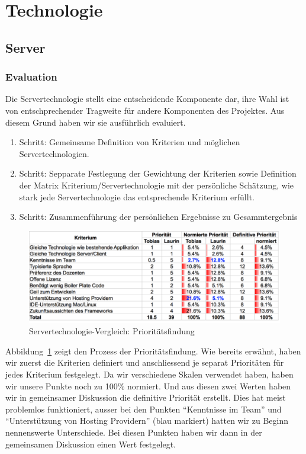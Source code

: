 \section{Technologie}
	\subsection{Server}

		\subsubsection{Evaluation}\label{serverEvaluation}
			Die Servertechnologie stellt eine entscheidende Komponente dar, 
			ihre Wahl ist von entschprechender Tragweite für andere Komponenten des Projektes.
			Aus diesem Grund haben wir sie ausführlich evaluiert.
			
			\begin{enumerate}
				\item Schritt: Gemeinsame Definition von Kriterien und möglichen Servertechnologien.
				\item Schritt: Sepparate Festlegung der Gewichtung der Kriterien sowie Definition der Matrix Kriterium/Servertechnologie mit der persönliche Schätzung, wie stark jede Servertechnologie das entsprechende Kriterium erfüllt.
				\item Schritt: Zusammenführung der persönlichen Ergebnisse zu Gesammtergebnis
			\end{enumerate}
		
			\begin{figure}[H]
				\begin{minipage}[b]{\linewidth}
					\includegraphics[width=\textwidth]{media/spreadsheets/ServertechnologieVergleichPrioritaetsfinding.pdf}
					\centering
					\caption{Servertechnologie-Vergleich: Prioritätsfindung}
					\label{fig:ServertechnologieVergleichPrioritaetsfinding}
				\end{minipage}
			\end{figure}
			
			Abbildung~\ref{fig:ServertechnologieVergleichPrioritaetsfinding} zeigt den Prozess der Prioritätsfindung.
			Wie bereits erwähnt, haben wir zuerst die Kriterien definiert und 
			anschliessend je separat Prioritäten für jedes Kriterium festgelegt.
			Da wir verschiedene Skalen verwendet haben, haben wir unsere Punkte noch zu 100\% normiert.
			Und aus diesen zwei Werten haben wir in gemeinsamer Diskussion die definitive Priorität erstellt.
			Dies hat meist problemlos funktioniert, ausser bei den Punkten "`Kenntnisse im Team"' und "`Unterstützung von Hosting Providern"' (blau markiert) hatten wir zu Beginn nennenswerte Unterschiede.
			Bei diesen Punkten haben wir dann in der gemeinsamen Diskussion einen Wert festgelegt.
		
